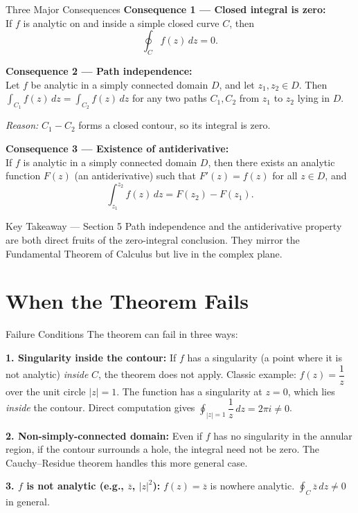 \documentclass[12pt,a4paper]{article}
\begin{document}
\begin{infobox}{Three Major Consequences}
\textbf{Consequence 1 --- Closed integral is zero:}\\
If $f$ is analytic on and inside a simple closed curve $C$, then
\[
  \oint_{C} f(z)\,dz = 0.
\]

\medskip
\textbf{Consequence 2 --- Path independence:}\\
Let $f$ be analytic in a simply connected domain $D$, and let $z_1, z_2 \in D$.
Then $\int_{C_1} f(z)\,dz = \int_{C_2} f(z)\,dz$ for any two paths $C_1, C_2$
from $z_1$ to $z_2$ lying in $D$.

\emph{Reason:} $C_1 - C_2$ forms a closed contour, so its integral is zero.

\medskip
\textbf{Consequence 3 --- Existence of antiderivative:}\\
If $f$ is analytic in a simply connected domain $D$, then there exists an analytic function
$F(z)$ (an antiderivative) such that $F'(z) = f(z)$ for all $z \in D$, and
\[
  \int_{z_1}^{z_2} f(z)\,dz = F(z_2) - F(z_1).
\]
\end{infobox}

\begin{learnbox}{Key Takeaway --- Section 5}
Path independence and the antiderivative property are both direct fruits of
the zero-integral conclusion.
They mirror the Fundamental Theorem of Calculus but live in the complex plane.
\end{learnbox}

\section{When the Theorem Fails}

\begin{infobox}{Failure Conditions}
The theorem can fail in three ways:

\textbf{1. Singularity inside the contour:}
If $f$ has a singularity (a point where it is not analytic) \emph{inside} $C$,
the theorem does not apply.
Classic example: $f(z) = \dfrac{1}{z}$ over the unit circle $|z| = 1$.
The function has a singularity at $z = 0$, which lies \emph{inside} the contour.
Direct computation gives $\oint_{|z|=1}\dfrac{1}{z}\,dz = 2\pi i \neq 0$.

\textbf{2. Non-simply-connected domain:}
Even if $f$ has no singularity in the annular region, if the contour surrounds a hole,
the integral need not be zero.
The Cauchy--Residue theorem handles this more general case.

\textbf{3. $f$ is not analytic (e.g., $\overline{z}$, $|z|^2$):}
$f(z) = \overline{z}$ is nowhere analytic.
$\oint_{C}\overline{z}\,dz \neq 0$ in general.
\end{infobox}
\end{document}
